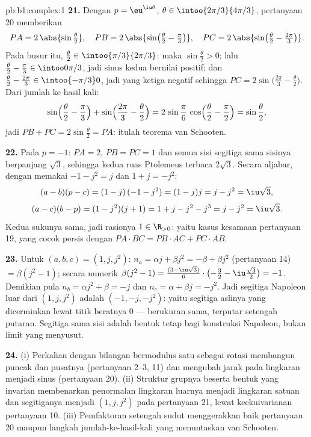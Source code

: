 \begin{solution}{pb:b1:complex:1}
\textbf{21.} Dengan $p = \eu^{\iu\theta}$, $\theta \in
\intoo{2\pi/3}{4\pi/3}$, pertanyaan 20 memberikan
\[
PA = 2\,\abs{\sin\tfrac\theta2},
\quad
PB = 2\,\abs{\sin\bigl(\tfrac\theta2 - \tfrac\pi3\bigr)},
\quad
PC = 2\,\abs{\sin\bigl(\tfrac\theta2 - \tfrac{2\pi}3\bigr)} .
\]
Pada busur itu, $\frac\theta2 \in \intoo{\pi/3}{2\pi/3}$: maka
$\sin\frac\theta2 > 0$; lalu $\frac\theta2 - \frac\pi3 \in
\intoo0{\pi/3}$, jadi sinus kedua bernilai positif; dan $\frac\theta2 -
\frac{2\pi}3 \in \intoo{-\pi/3}0$, jadi yang ketiga negatif sehingga
$PC = 2\sin\bigl(\frac{2\pi}3 - \frac\theta2\bigr)$. Dari jumlah ke
hasil kali:
\[
\sin\Bigl(\frac\theta2 - \frac\pi3\Bigr) +
\sin\Bigl(\frac{2\pi}3 - \frac\theta2\Bigr)
= 2\,\sin\frac\pi6\,\cos\Bigl(\frac\theta2 - \frac\pi2\Bigr)
= \sin\frac\theta2 ,
\]
jadi $PB + PC = 2\sin\frac\theta2 = PA$: itulah teorema van Schooten.

\textbf{22.} Pada $p = -1$: $PA = 2$, $PB = PC = 1$ dan semua sisi
segitiga sama sisinya berpanjang $\sqrt3$, sehingga kedua ruas
Ptolemeus terbaca $2\sqrt3$. Secara aljabar, dengan memakai $-1 - j^2 = j$ dan
$1 + j = -j^2$:
\[
(a - b)(p - c) = (1 - j)\,(-1 - j^2) = (1 - j)j = j - j^2
= \iu\sqrt3 ,
\]
\[
(a - c)(b - p) = (1 - j^2)(j + 1) = 1 + j - j^2 - j^3
= j - j^2 = \iu\sqrt3 .
\]
Kedua sukunya sama, jadi rasionya
$1 \in \R_{>0}$: yaitu kasus kesamaan pertanyaan 19, yang cocok persis dengan $PA
\cdot BC = PB \cdot AC + PC \cdot AB$.

\textbf{23.} Untuk $(a, b, c) = (1, j, j^2)$: $n_a = \alpha j +
\beta j^2 = -\beta + \beta j^2$ (pertanyaan 14) $= \beta(j^2 - 1)$;
secara numerik $\beta(j^2 - 1) = \frac{(3 - \iu\sqrt3)}6 \cdot
\bigl(-\frac32 - \iu\frac{\sqrt3}2\bigr) = -1$. Demikian pula $n_b =
\alpha j^2 + \beta = -j$ dan $n_c = \alpha + \beta j = -j^2$. Jadi
segitiga Napoleon luar dari $(1, j, j^2)$ adalah $(-1, -j, -j^2)$: yaitu
segitiga aslinya yang dicerminkan lewat titik beratnya $0$ --- berukuran
sama, terputar setengah putaran. Segitiga sama sisi adalah bentuk tetap
bagi konstruksi Napoleon, bukan limit yang menyusut.

\textbf{24.} (i) Perkalian dengan bilangan bermodulus satu sebagai rotasi
membangun puncak dan pusatnya (pertanyaan 2--3, 11) dan mengubah
jarak pada lingkaran menjadi sinus (pertanyaan 20). (ii) Struktur
grupnya beserta bentuk yang invarian membenarkan penormalan
lingkaran luarnya menjadi lingkaran satuan dan segitiganya menjadi $(1, j, j^2)$
pada pertanyaan 21, lewat keekuivarianan pertanyaan 10. (iii) Pemfaktoran
setengah sudut menggerakkan baik pertanyaan 20 maupun langkah
jumlah-ke-hasil-kali yang menuntaskan van Schooten.


\end{solution}
